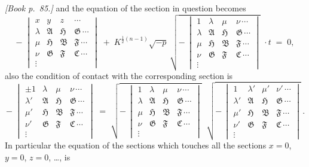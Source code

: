\documentclass[11pt]{article}
\providecommand{\fA}{\mathfrak{A}}
\providecommand{\fB}{\mathfrak{B}}
\providecommand{\fC}{\mathfrak{C}}
\providecommand{\fF}{\mathfrak{F}}
\providecommand{\fG}{\mathfrak{G}}
\providecommand{\fH}{\mathfrak{H}}
\begin{document}
\bigskip

\noindent\emph{[Book p.~85.]} and the equation of the section in question becomes
\[
-\;\begin{vmatrix} x & y & z & \cdots \\ \lambda & \fA & \fH & \fG\,\cdots \\ \mu & \fH & \fB & \fF\,\cdots \\ \nu & \fG & \fF & \fC\,\cdots \\ \vdots \end{vmatrix}
\;+\; K^{\frac{1}{2}(n-1)}\sqrt{-p}\,\sqrt{-\,\begin{vmatrix} 1 & \lambda & \mu & \nu\,\cdots \\ \lambda & \fA & \fH & \fG\,\cdots \\ \mu & \fH & \fB & \fF\,\cdots \\ \nu & \fG & \fF & \fC\,\cdots \\ \vdots \end{vmatrix}}\;\cdot t \;=\; 0,
\]
also the condition of contact with the corresponding section is
\[
-\;\begin{vmatrix} \pm 1 & \lambda & \mu & \nu\,\cdots \\ \lambda' & \fA & \fH & \fG\,\cdots \\ \mu' & \fH & \fB & \fF\,\cdots \\ \nu' & \fG & \fF & \fC\,\cdots \\ \vdots \end{vmatrix}
\;=\;\sqrt{-\,\begin{vmatrix} 1 & \lambda & \mu & \nu\,\cdots \\ \lambda & \fA & \fH & \fG\,\cdots \\ \mu & \fH & \fB & \fF\,\cdots \\ \nu & \fG & \fF & \fC\,\cdots \\ \vdots \end{vmatrix}}\;\;
\sqrt{-\,\begin{vmatrix} 1 & \lambda' & \mu' & \nu'\,\cdots \\ \lambda' & \fA & \fH & \fG\,\cdots \\ \mu' & \fH & \fB & \fF\,\cdots \\ \nu' & \fG & \fF & \fC\,\cdots \\ \vdots \end{vmatrix}}\,.
\]
In particular the equation of the sections which touches all the sections $x = 0$, $y = 0$, $z = 0$, \ldots, is
\end{document}
